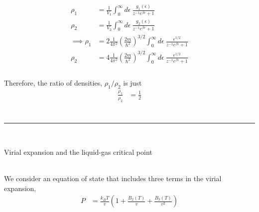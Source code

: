 \documentclass[]{article}
\begin{document}
\begin{enumerate}[1.]
\begin{itemize}
\begin{equation}
\begin{aligned}
\rho_1 & = \frac{ 1 }{ V_1 } \int_{0}^{\infty} d\epsilon \: \frac{ g_1(\epsilon) }{ z^{-1} e^{\beta \epsilon } +1 } \\
%
\rho_2 & = \frac{ 1 }{ V_2 }  \int_{0}^{\infty} d\epsilon \: \frac{ g_2(\epsilon) }{ z^{-1} e^{\beta \epsilon } +1 } \\
%
\implies \rho_1 & = 2 \frac{ 1 }{ 4\pi^2 } \left(  \frac{ 2m }{ \hbar^2 } \right)^{3/2}  \int_{0}^{\infty} d\epsilon \: \frac{ \epsilon^{1/2} }{ z^{-1} e^{\beta \epsilon } +1 } \\
%
\rho_2 & = 4 \frac{ 1 }{ 4\pi^2 } \left(  \frac{ 2m }{ \hbar^2 } \right)^{3/2}  \int_{0}^{\infty} d\epsilon \: \frac{ \epsilon^{1/2} }{ z^{-1} e^{\beta \epsilon } +1 } \\
%
\end{aligned}
\end{equation} \\

Therefore, the ratio of densities, $\rho_1/\rho_2$ is just \\

\begin{equation}
\begin{aligned}
\frac{ \rho_1 }{ \rho_2 } & = \frac{ 1 }{2 } \\
\end{aligned}
\end{equation} \\









\end{itemize}




\noindent\rule{15cm}{0.4pt} \\



\newpage




{\bf \item Virial expansion and the liquid-gas critical point} \\

We consider an equation of state that includes three terms in the virial expansion, \\

\begin{equation}
\begin{aligned}
P & = \frac{ k_B T}{ v} \left(  1 + \frac{ B_2(T) }{v} + \frac{ B_3(T) }{ v^2 }   \right) \\
\end{aligned}
\end{equation} \\


\end{enumerate}
\end{document}
